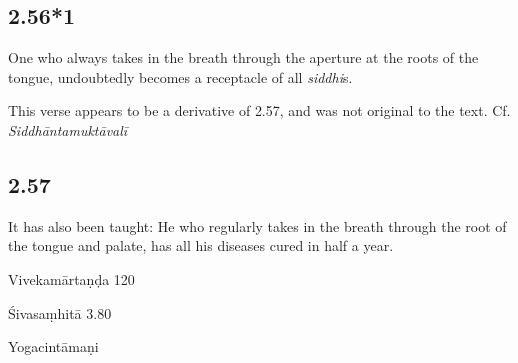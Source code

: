 \begin{ekdosis}
\subsection*{2.56*1}
\begin{translation}[hp02_056_1]
One who always takes in the breath through the aperture at the roots of the tongue, undoubtedly becomes a receptacle of all \emph{siddhi}s.
\end{translation}


\begin{philcomm}[hp02_056_1]
This verse appears to be a derivative of 2.57, and was not original to the text. Cf. \emph{Siddhāntamuktāvalī}
\begin{versinnote}
\end{versinnote}
\end{philcomm}

\subsection*{2.57}
\begin{translation}[hp02_057]
It has also been taught:
He who regularly takes in the breath through the root of the tongue and palate, has all his diseases cured in half a year.
\end{translation}

\begin{sources}[hp02_057]
Vivekamārtaṇḍa 120

\begin{versinnote}
\end{versinnote}

Śivasaṃhitā 3.80

\begin{versinnote}
\end{versinnote}
\end{sources}

\begin{testimonia}[hp02_057]
Yogacintāmaṇi


\end{testimonia}
\end{ekdosis}
